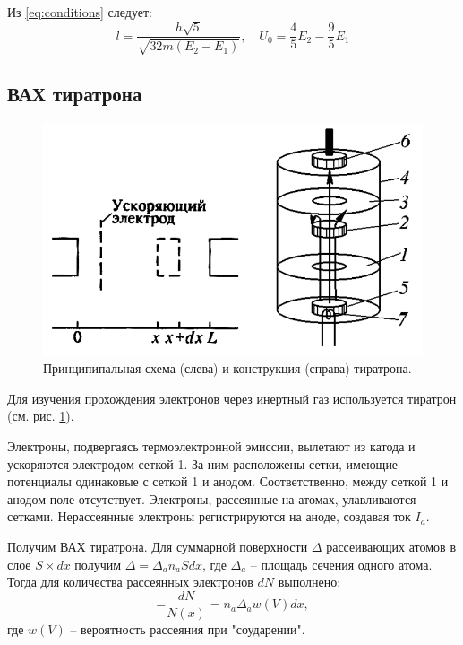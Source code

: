 \documentclass[12pt,a4paper]{article}
\newcommand{\figref}[1]{(см. рис. \ref{#1})}
\begin{document}
	Из \eqref{eq:conditions} следует:
	\begin{equation}
		l = \frac{h \sqrt{5}}{\sqrt{32 m (E_2 - E_1)}}, \quad U_0 = \frac{4}{5} E_2 - \frac{9}{5} E_1
		\label{eq:l_U0}
	\end{equation}
	
	\subsection*{ВАХ тиратрона}
	
	\begin{figure}
		\includegraphics[scale=0.5]{res/tiratron.png}
		\caption{Принципипальная схема (слева) и конструкция (справа) тиратрона.}
		\label{fig:tiratron}
		\vspace{0pt}
	\end{figure}
	
	Для изучения прохождения электронов через инертный газ используется тиратрон \figref{fig:tiratron}.
	
	Электроны, подвергаясь термоэлектронной эмиссии, вылетают из катода и ускоряются электродом-сеткой 1. За ним расположены сетки, имеющие потенциалы одинаковые с сеткой 1 и анодом. Соответственно, между сеткой 1 и анодом поле отсутствует. Электроны, рассеянные на атомах, улавливаются сетками. Нерассеянные электроны регистрируются на аноде, создавая ток $I_a$.
	
	Получим ВАХ тиратрона. Для суммарной поверхности $\Delta$ рассеивающих атомов в слое $S \times dx$ получим $\Delta = \Delta_a n_a S dx$, где $\Delta_a$ -- площадь сечения одного атома. Тогда для количества рассеянных электронов $dN$ выполнено:
	\begin{equation}
		-\frac{dN}{N(x)} = n_a \Delta_a w(V) dx,
	\end{equation}
	где $w(V)$ -- вероятность рассеяния при "соударении".
	
\end{document}
